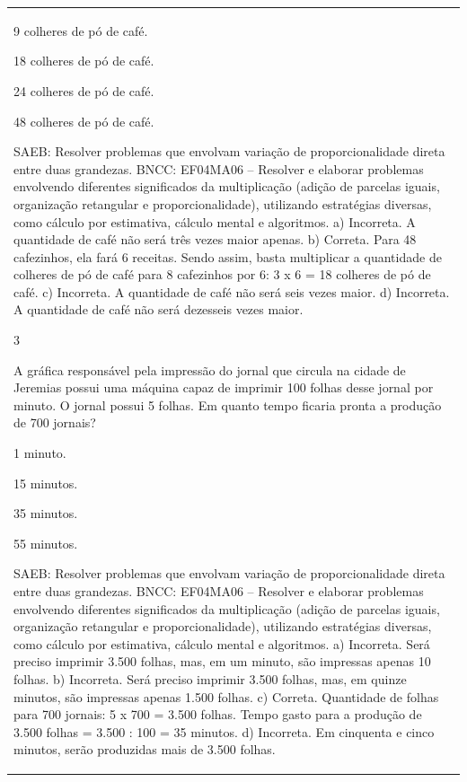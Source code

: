 \begin{mdframed}[linewidth=2pt,linecolor=salmao,roundcorner=2pt]
\begin{escolha}
{{{\begin{longtable}[]{@{}l@{}}
\begin{itemize}
\begin{escolha}
\item
  9 colheres de pó de café.
\item
  18 colheres de pó de café.
\item
  24 colheres de pó de café.
\item
  48 colheres de pó de café.
\end{escolha}

SAEB: Resolver problemas que envolvam variação de proporcionalidade direta entre duas grandezas.
BNCC: EF04MA06 -- Resolver e elaborar problemas envolvendo diferentes significados da multiplicação
(adição de parcelas iguais, organização retangular e proporcionalidade), utilizando estratégias
diversas, como cálculo por estimativa, cálculo mental e algoritmos.
a) Incorreta. A quantidade de café não será três vezes maior apenas.
b) Correta. Para 48 cafezinhos, ela fará 6 receitas. Sendo assim, basta
multiplicar a quantidade de colheres de pó de café para 8 cafezinhos por
6: 3 x 6 = 18 colheres de pó de café.
c) Incorreta. A quantidade de café não será seis vezes maior.
d) Incorreta. A quantidade de café não será dezesseis vezes maior.

\num{3}

A gráfica responsável pela impressão do jornal que circula na cidade de
Jeremias possui uma máquina capaz de imprimir 100 folhas desse jornal
por minuto. O jornal possui 5 folhas. Em quanto
tempo ficaria pronta a produção de 700 jornais?

\begin{escolha}
\item
  1 minuto.
\item
  15 minutos.
\item
  35 minutos.
\item
  55 minutos.
\end{escolha}

SAEB: Resolver problemas que envolvam variação de proporcionalidade direta entre duas grandezas.
BNCC: EF04MA06 -- Resolver e elaborar problemas envolvendo diferentes significados da multiplicação
(adição de parcelas iguais, organização retangular e proporcionalidade), utilizando estratégias
diversas, como cálculo por estimativa, cálculo mental e algoritmos.
a) Incorreta. Será preciso imprimir 3.500 folhas, mas, em um minuto, são impressas apenas 10 folhas.
b) Incorreta. Será preciso imprimir 3.500 folhas, mas, em quinze minutos, são impressas apenas 1.500 folhas.
c) Correta. Quantidade de folhas para 700 jornais: 5 x 700 = 3.500 folhas.
Tempo gasto para a produção de 3.500 folhas = 3.500 : 100 = 35 minutos.
d) Incorreta. Em cinquenta e cinco minutos, serão produzidas mais de 3.500 folhas.


\end{itemize}
\end{longtable}}}}
\end{escolha}
\end{mdframed}
